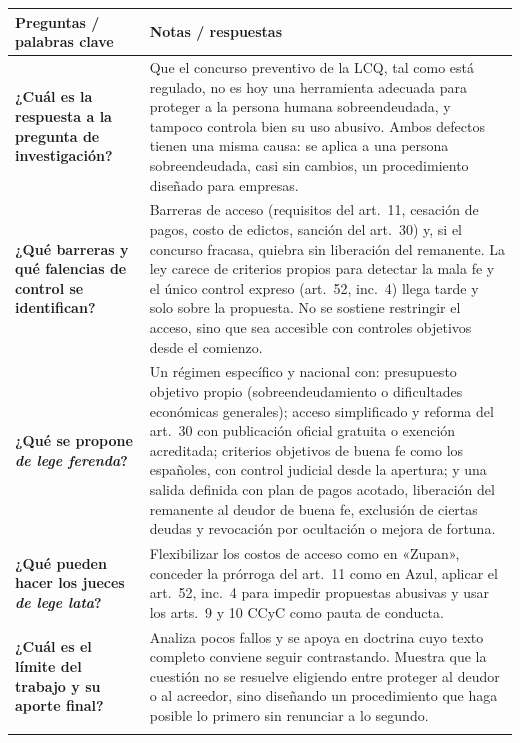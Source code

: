 \documentclass[12pt,oneside]{book}
\makeatletter
\newcommand{\cornellresumen}[1]{%
  \midrule
  \multicolumn{2}{@{}p{\dimexpr0.92\textwidth+2\tabcolsep+\arrayrulewidth\relax}@{}}{%
    \textbf{Resumen:} #1} \\
}
\newenvironment{cornell}{%
  \renewcommand{\arraystretch}{1.2}%
  \begin{longtable}{@{}>{\raggedright\arraybackslash}p{0.27\textwidth}|>{\raggedright\arraybackslash}p{0.65\textwidth}@{}}
  \toprule
  \textbf{Preguntas / palabras clave} & \textbf{Notas / respuestas} \\
  \midrule
  \endhead
}{%
  \bottomrule
  \end{longtable}%
}
\makeatother
\begin{document}
\begin{cornell}
\textbf{¿Cuál es la respuesta a la pregunta de investigación?} &
Que el concurso preventivo de la LCQ, tal como está regulado, no es hoy una herramienta adecuada para proteger a la persona humana sobreendeudada, y tampoco controla bien su uso abusivo. Ambos defectos tienen una misma causa: se aplica a una persona sobreendeudada, casi sin cambios, un procedimiento diseñado para empresas. \\
\addlinespace

\textbf{¿Qué barreras y qué falencias de control se identifican?} &
Barreras de acceso (requisitos del art.~11, cesación de pagos, costo de edictos, sanción del art.~30) y, si el concurso fracasa, quiebra sin liberación del remanente. La ley carece de criterios propios para detectar la mala fe y el único control expreso (art.~52, inc.~4) llega tarde y solo sobre la propuesta. No se sostiene restringir el acceso, sino que sea accesible con controles objetivos desde el comienzo. \\
\addlinespace

\textbf{¿Qué se propone \textit{de lege ferenda}?} &
Un régimen específico y nacional con: presupuesto objetivo propio (sobreendeudamiento o dificultades económicas generales); acceso simplificado y reforma del art.~30 con publicación oficial gratuita o exención acreditada; criterios objetivos de buena fe como los españoles, con control judicial desde la apertura; y una salida definida con plan de pagos acotado, liberación del remanente al deudor de buena fe, exclusión de ciertas deudas y revocación por ocultación o mejora de fortuna. \\
\addlinespace

\textbf{¿Qué pueden hacer los jueces \textit{de lege lata}?} &
Flexibilizar los costos de acceso como en «Zupan», conceder la prórroga del art.~11 como en Azul, aplicar el art.~52, inc.~4 para impedir propuestas abusivas y usar los arts.~9 y 10 CCyC como pauta de conducta. \\
\addlinespace

\textbf{¿Cuál es el límite del trabajo y su aporte final?} &
Analiza pocos fallos y se apoya en doctrina cuyo texto completo conviene seguir contrastando. Muestra que la cuestión no se resuelve eligiendo entre proteger al deudor o al acreedor, sino diseñando un procedimiento que haga posible lo primero sin renunciar a lo segundo. \\
\cornellresumen{El concurso de la LCQ no protege adecuadamente al deudor sobreendeudado ni controla bien el abuso, por aplicar un procedimiento empresario. Se propone un régimen nacional específico con presupuesto propio, acceso simplificado, criterios objetivos de buena fe y salida definida; mientras tanto, los jueces disponen de herramientas de equilibrio razonable.}
\end{cornell}
\end{document}
